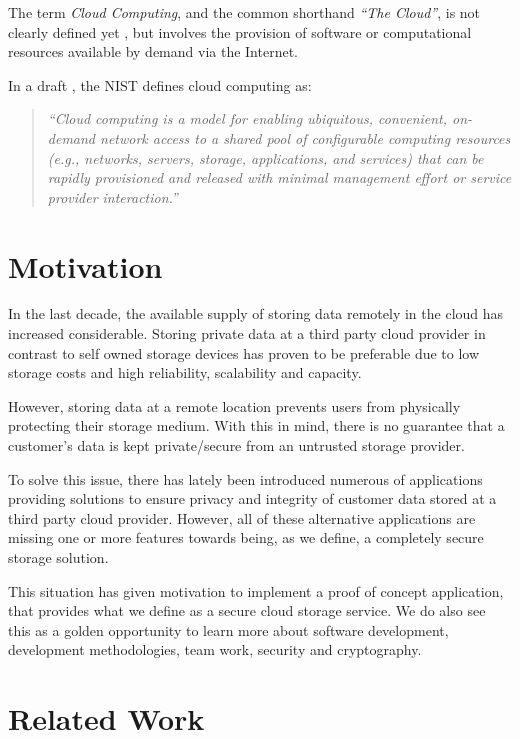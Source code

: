 \documentclass[pdftex,english,10pt,b5paper,twoside]{book}
\begin{document}

The term \emph{Cloud Computing}, and the common shorthand \emph{``The Cloud''},
is not clearly defined yet \cite{clouddef}, but involves the provision of
software or computational resources available by demand via the Internet.

In a draft \cite{cloud_nistdef}, the \ac{NIST} defines cloud computing as:
\begin{quote}\it
``Cloud computing is a model for enabling ubiquitous, convenient,
on-demand network access to a shared pool of configurable computing resources
(e.g., networks, servers, storage, applications, and services) that can be
rapidly provisioned and released with minimal management effort or service
provider interaction.''
\end{quote}

\section{Motivation}

In the last decade, the available supply of storing data remotely in the cloud
has increased considerable. Storing private data at a third party cloud
provider in contrast to self owned storage devices has proven to be preferable
due to low storage costs and high reliability, scalability and capacity.

However, storing data at a remote location prevents users from physically
protecting their storage medium. With this in mind, there is no guarantee that a
customer's data is kept private/secure from an untrusted storage provider.

To solve this issue, there has lately been introduced numerous of applications
providing solutions to ensure privacy and integrity of customer data stored at a
third party cloud provider. However, all of these alternative applications are
missing one or more features towards being, as we define, a completely secure
storage solution. %

This situation has given motivation to implement a proof of concept
application, that provides what we define as a secure cloud storage service.
We do also see this as a golden opportunity to learn more about software development,
development methodologies, team work, security and cryptography.


\section{Related Work}
\end{document}
